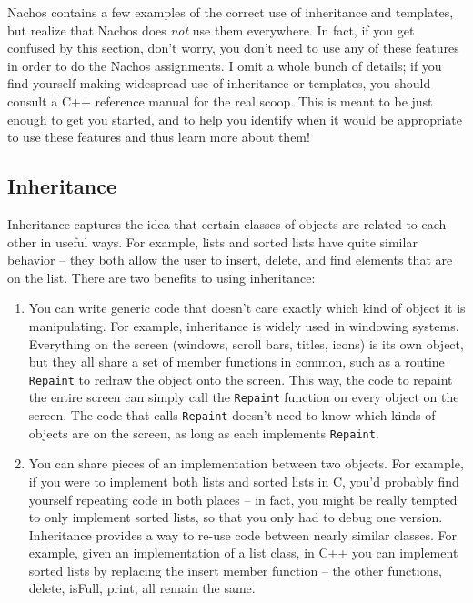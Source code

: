 Nachos contains a few examples of the correct use of inheritance 
and templates, but realize that Nachos does {\em not} use them
everywhere.  In fact, if you get confused by this section, don't worry,
you don't need to use any of these features in order to do the Nachos
assignments.  I omit a whole bunch of details; if you find yourself
making widespread use of inheritance or templates, you should consult a C++
reference manual for the real scoop.  This is meant to
be just enough to get you started, and to help you identify when it would
be appropriate to use these features and thus learn more
about them!

\subsection{Inheritance}
Inheritance captures the idea that certain classes of objects are
related to each other in useful ways.  For example, lists
and sorted lists have quite similar behavior -- they both 
allow the user to insert, delete, and find elements that are
on the list.  There are two benefits to using inheritance:

\begin{enumerate}

\item You can write generic code that doesn't
care exactly which kind of object it is manipulating.  For
example, inheritance is widely used in windowing systems.
Everything on the screen (windows, scroll bars, titles, icons)
is its own object, but they all share a set of member functions
in common, such as a routine {\tt Repaint} to redraw the object
onto the screen.  This way, the code to repaint the entire screen 
can simply call the {\tt Repaint} function on every object on the screen.
The code that calls {\tt Repaint} doesn't need to know which
kinds of objects are on the screen, as long as each implements
{\tt Repaint}.

\item You can share pieces of an implementation between two
objects.  For example, if you were to implement both lists and 
sorted lists in C, you'd probably find yourself repeating code
in both places -- in fact, you might be really tempted to
only implement sorted lists, so that you only had to debug
one version.  Inheritance provides a way to re-use code
between nearly similar classes.  For example, given an implementation
of a list class, in C++ you can implement sorted lists by replacing
the insert member function -- the other functions, delete, isFull,
print, all remain the same.

\end{enumerate}

